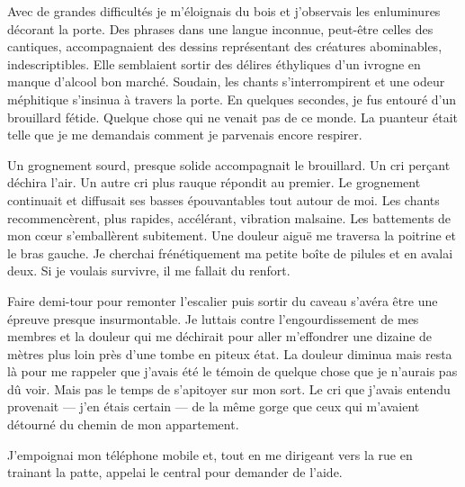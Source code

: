 Avec de grandes difficultés je m'éloignais du bois et j'observais les enluminures décorant la porte. Des phrases dans 
une langue inconnue, peut-être celles des cantiques, accompagnaient des dessins représentant des créatures abominables, 
indescriptibles. Elle semblaient sortir des délires éthyliques d'un ivrogne en manque d'alcool bon marché. Soudain, les 
chants s'interrompirent et une odeur méphitique s'insinua à travers la porte. En quelques secondes, je fus entouré 
d'un brouillard fétide. Quelque chose qui ne venait pas de ce monde. La puanteur était telle que je me demandais 
comment je parvenais encore respirer.

Un grognement sourd, presque solide accompagnait le brouillard. Un cri perçant déchira l'air. Un autre cri plus rauque 
répondit au premier. Le grognement continuait et diffusait ses basses épouvantables tout autour de moi. Les chants 
recommencèrent, plus rapides, accélérant, vibration malsaine. Les battements de mon cœur s'emballèrent subitement. Une 
douleur aiguë me traversa la poitrine et le bras gauche. Je cherchai frénétiquement ma petite boîte de pilules et en 
avalai deux. Si je voulais survivre, il me fallait du renfort.

Faire demi-tour pour remonter l'escalier puis sortir du caveau s'avéra être une épreuve presque insurmontable. Je 
luttais contre l'engourdissement de mes membres et la douleur qui me déchirait pour aller m'effondrer une dizaine de 
mètres plus loin près d'une tombe en piteux état. La douleur diminua mais resta là pour me rappeler que j'avais été le 
témoin de quelque chose que je n'aurais pas dû voir. Mais pas le temps de s'apitoyer sur mon sort. Le cri que j'avais 
entendu provenait — j'en étais certain — de la même gorge que ceux qui m'avaient détourné du chemin de mon appartement.

J'empoignai mon téléphone mobile et, tout en me dirigeant vers la rue en trainant la patte, appelai le central pour 
demander de l'aide.